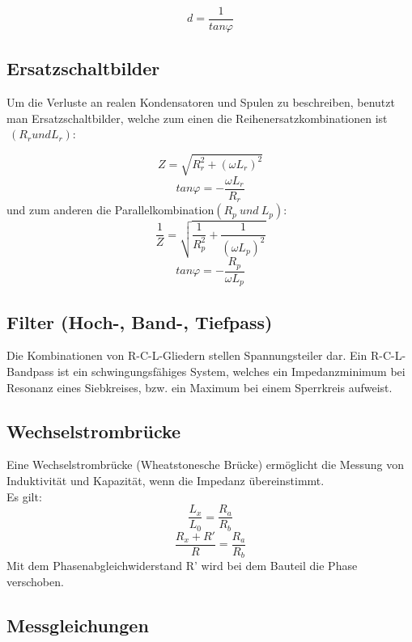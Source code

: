 \documentclass{article}
\begin{document}
\begin{equation}
d=\frac{1}{tan \varphi }
\end{equation}

\subsection{Ersatzschaltbilder}
Um die Verluste an realen Kondensatoren und Spulen zu beschreiben, benutzt man Ersatzschaltbilder, welche zum einen die Reihenersatzkombinationen ist\(\ (R_{r} und L_{r}) \):

\begin{equation}
Z=\sqrt{R_{r}^2+(\omega L_{r})^2}
\end{equation}
\begin{equation}
tan \varphi =-\frac{\omega L_{r}}{R_{r}}
\end{equation}
und zum anderen die Parallelkombination\((R_{p}\ und\ L_{p}) \):
\begin{equation}
\frac{1}{Z}=\sqrt{\frac{1}{R_{p}^2}+\frac{1}{(\omega L_{p})^2}}
\end{equation}
\begin{equation}
tan\varphi =-\frac{R_{p}}{\omega L_{p}}
\end{equation}
\subsection{Filter (Hoch-, Band-, Tiefpass)}
Die Kombinationen von R-C-L-Gliedern stellen Spannungsteiler dar.
Ein R-C-L-Bandpass ist ein schwingungsfähiges System, welches ein Impedanzminimum bei Resonanz eines Siebkreises, bzw. ein Maximum bei einem Sperrkreis aufweist.

\subsection{Wechselstrombrücke}
Eine Wechselstrombrücke (Wheatstonesche Brücke) ermöglicht die Messung von Induktivität und Kapazität, wenn die Impedanz übereinstimmt.\\
Es gilt:
\begin{equation}
\frac{L_{x}}{L_{0}}=\frac{R_{a}}{R_{b}}
\end{equation}
\begin{equation}
\frac{R_{x}+R'}{R}=\frac{R_{a}}{R_{b}}
\end{equation}
Mit dem Phasenabgleichwiderstand R' wird bei dem Bauteil die Phase verschoben.

\subsection{Messgleichungen}
\end{document}
